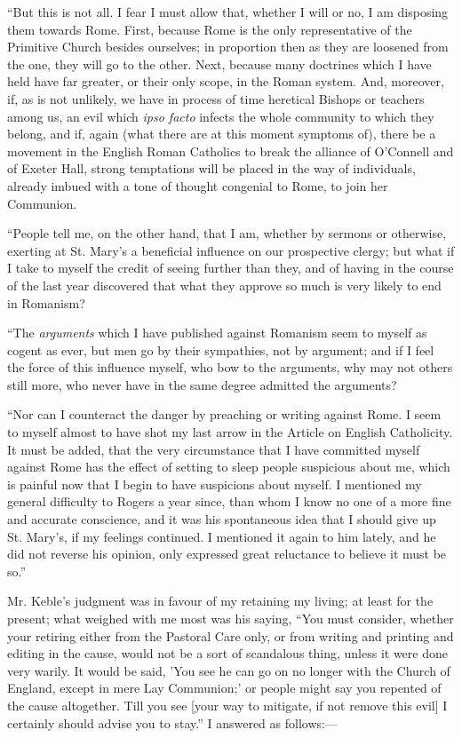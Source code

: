 ``But this is not all. I fear I must allow that, whether I will
or no, I am disposing them towards Rome. First, because Rome is the only
representative of the Primitive Church besides ourselves; in proportion
then as they are loosened from the one, they will go to the other. Next,
because many doctrines which I have held have far greater, or their
only scope, in the Roman system. And, moreover, if, as is not unlikely,
we have in process of time heretical Bishops or teachers among us, an
evil which \emph{ipso facto} infects the whole community to which they
belong, and if, again (what there are at this moment symptoms of), there
be a movement in the English Roman Catholics to break the alliance of
O'Connell and of Exeter Hall, strong temptations will be placed in the
way of individuals, already imbued with a tone of thought congenial to
Rome, to join her Communion.

``People tell me, on the other hand, that I am, whether by
sermons or otherwise, exerting at St. Mary's a beneficial influence on
our prospective clergy; but what if I take to myself the credit of
seeing further than they, and of having in the course of the last year
discovered that what they approve so much is very likely to end in
Romanism?

``The \emph{arguments} which I have published against Romanism
seem to myself as cogent as ever, but men go by their sympathies, not by
argument; and if I feel the force of this influence myself, who bow to
the arguments, why may not others still more, who never have in the same
degree admitted the arguments?

``Nor can I counteract the danger by preaching or writing against
Rome. I seem to myself almost to have shot my last arrow in the Article
on English Catholicity. It must be added, that the very circumstance
that I have committed myself against Rome has the effect of setting to
sleep people suspicious about me, which is painful now that I begin to
have suspicions about myself. I mentioned my general difficulty to
Rogers a year since, than whom I know no one of a more fine and
accurate conscience, and it was his spontaneous idea that I should give
up St. Mary's, if my feelings continued. I mentioned it again to
him lately, and he did not reverse his opinion, only expressed great
reluctance to believe it must be so.''

Mr. Keble's judgment was in favour of my retaining my living; at least for the present; what weighed with me most was his
saying, ``You must consider, whether your retiring either from the
Pastoral Care only, or from writing and printing and editing in the
cause, would not be a sort of scandalous thing, unless it were done very
warily. It would be said, 'You see he can go on no longer with the
Church of England, except in mere Lay Communion;' or people might say
you repented of the cause altogether. Till you see [your way to
mitigate, if not remove this evil] I certainly should advise
you to stay.'' I answered as follows:—


